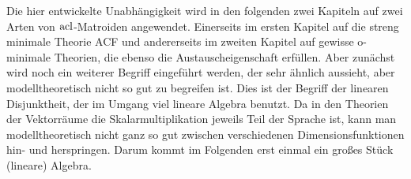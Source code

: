 Die hier entwickelte Unabhängigkeit wird in den folgenden zwei Kapiteln auf zwei Arten von $\operatorname{acl}$-Matroiden angewendet. Einerseits im ersten Kapitel auf die streng minimale Theorie ACF und andererseits im zweiten Kapitel auf gewisse o-minimale Theorien, die ebenso die Austauscheigenschaft erfüllen. Aber zunächst wird noch ein weiterer Begriff eingeführt werden, der sehr ähnlich aussieht, aber modelltheoretisch nicht so gut zu begreifen ist. Dies ist der Begriff der linearen Disjunktheit, der im Umgang viel lineare Algebra benutzt. Da in den Theorien der Vektorräume die Skalarmultiplikation jeweils Teil der Sprache ist, kann man modelltheoretisch nicht ganz so gut zwischen verschiedenen Dimensionsfunktionen hin- und herspringen. Darum kommt im Folgenden erst einmal ein großes Stück (lineare) Algebra.